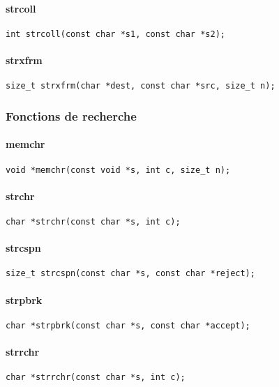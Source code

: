 \paragraph{strcoll}
\begin{Verbatim}
int strcoll(const char *s1, const char *s2);
\end{Verbatim}
\paragraph{strxfrm}
\begin{Verbatim}
size_t strxfrm(char *dest, const char *src, size_t n);
\end{Verbatim}

\subsubsection{Fonctions de recherche}

\paragraph{memchr}
\begin{Verbatim}
void *memchr(const void *s, int c, size_t n);
\end{Verbatim}
\paragraph{strchr}
\begin{Verbatim}
char *strchr(const char *s, int c);
\end{Verbatim}
\paragraph{strcspn}
\begin{Verbatim}
size_t strcspn(const char *s, const char *reject);
\end{Verbatim}
\paragraph{strpbrk}
\begin{Verbatim}
char *strpbrk(const char *s, const char *accept);
\end{Verbatim}
\paragraph{strrchr}
\begin{Verbatim}
char *strrchr(const char *s, int c);
\end{Verbatim}
